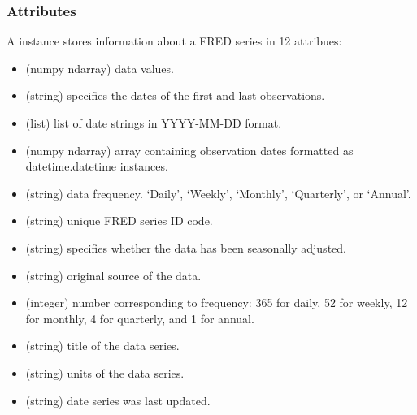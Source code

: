 \documentclass[letterpaper,10pt,openany,oneside,english]{sphinxmanual}
\begin{document}
\subsubsection{Attributes}
\label{\detokenize{fredpy_examples:Attributes}}
A {\hyperref[\detokenize{series_class:fredpy.series}]{}} instance stores information about a FRED series in 12 attribues:
\begin{itemize}
\item {} 
     (numpy ndarray) \textendash{} data values.

\item {} 
        (string) \textendash{} specifies the dates of the first and last observations.

\item {} 
    (list) \textendash{} list of date strings in YYYY-MM-DD format.

\item {} 
        (numpy ndarray) \textendash{} array containing observation dates formatted as datetime.datetime instances.

\item {} 
     (string) \textendash{} data frequency. ‘Daily’, ‘Weekly’, ‘Monthly’, ‘Quarterly’, or ‘Annual’.

\item {} 
   (string) \textendash{} unique FRED series ID code.

\item {} 
   (string) \textendash{} specifies whether the data has been seasonally adjusted.

\item {} 
   (string) \textendash{} original source of the data.

\item {} 
        (integer) \textendash{} number corresponding to frequency: 365 for daily, 52 for weekly, 12 for monthly, 4 for quarterly, and 1 for annual.

\item {} 
    (string) \textendash{} title of the data series.

\item {} 
    (string) \textendash{} units of the data series.

\item {} 
  (string) \textendash{} date series was last updated.

\end{itemize}
\end{document}
